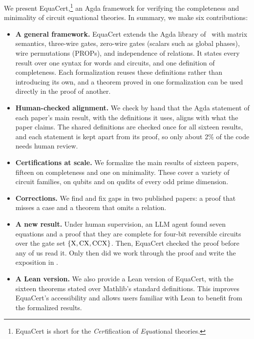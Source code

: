 \documentclass[acmsmall,screen,nonacm]{acmart}
\begin{document}
We present EquaCert,\footnote{EquaCert is short for the
  \emph{Cert}ification of \emph{Equa}tional theories.} an Agda framework for verifying the
completeness and minimality of circuit equational theories. In summary, we make six contributions:
\begin{itemize}
\item \textbf{A general framework.} EquaCert extends the Agda library
  of~\citet{bian2027popl} with matrix semantics, three-wire gates,
  zero-wire gates (scalars such as global phases), wire permutations (PROPs), and
  independence of relations. It states every result over one syntax for words and circuits, and one definition of completeness. Each formalization reuses these definitions rather than introducing its own, and a theorem proved in one formalization can be used directly in the proof of another.
\item \textbf{Human-checked alignment.} We check by hand that the
  Agda statement of each paper's main result, with the definitions it
  uses, aligns with what the paper claims. The shared
  definitions are checked once for all sixteen results, and each
  statement is kept apart from its proof, so only about 2\% of the code needs human
  review.
\item \textbf{Certifications at scale.} We formalize the main results
  of sixteen papers, fifteen on completeness and one on minimality.
  These cover a variety of circuit families, on qubits and on qudits
  of every odd prime dimension.
\item \textbf{Corrections.} We find and fix gaps in two published
  papers: a proof that misses a case and a theorem that omits a
  relation.
\item \textbf{A new result.} Under human supervision, an LLM agent found seven equations and a
  proof that they are complete for four-bit reversible circuits over the
  gate set $\{\mathrm{X},\mathrm{CX},\mathrm{CCX}\}$. Then, EquaCert checked the proof before any
  of us read it. Only then did we work through the proof and write the
  exposition in .
\item \textbf{A Lean version.} We also provide a Lean version of EquaCert, with the sixteen theorems stated over Mathlib's standard definitions. This improves EquaCert's accessibility and allows users familiar with Lean to benefit from the formalized results.
\end{itemize}
\end{document}
